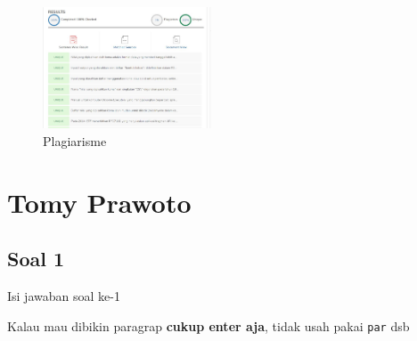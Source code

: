 \begin{enumerate}
   \begin{figure}[H]
	\includegraphics[width=5cm]{figures/4/1144124/Chapter4/Plagiarisme.jpg}
	\centering
    \caption{Plagiarisme}
    \label{Plagiarisme}
    \end{figure}
 \end{enumerate}

\section{Tomy Prawoto}
\subsection{Soal 1}
Isi jawaban soal ke-1

Kalau mau dibikin paragrap \textbf{cukup enter aja}, tidak usah pakai \verb|par| dsb


